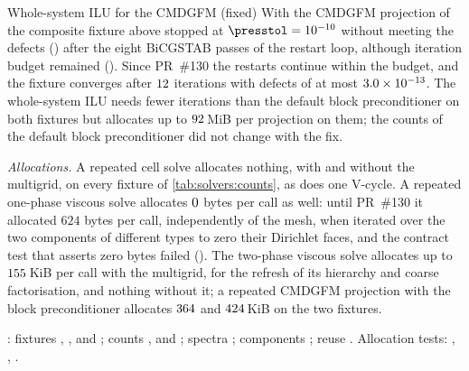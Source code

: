 \begin{deviation}{Whole-system ILU for the CMDGFM (fixed)}\label{dev:solvers:ilu}
With  the CMDGFM projection of the composite fixture
above stopped at $\presstol=10^{-10}$ without meeting the defects
() after the eight BiCGSTAB passes of the restart loop,
although iteration budget remained (). Since PR~\#130 the restarts
continue within the budget, and the fixture converges after
$12$ iterations with defects of at most
$3.0\times10^{-13}$. The whole-system ILU needs fewer iterations than
the default block preconditioner on both fixtures but allocates up to
$92$\,MiB per projection on them; the counts of the default
block preconditioner did not change with the fix.
\end{deviation}

\emph{Allocations.} A repeated cell solve allocates nothing, with and without
the multigrid, on every fixture of \cref{tab:solvers:counts}, as does one
V-cycle. A repeated one-phase viscous solve allocates
$0$ bytes per call as well: until PR~\#130 it allocated
$624$ bytes per call, independently of the mesh, when 
iterated over the two components of different types to zero their Dirichlet
faces, and the contract test that asserts zero bytes failed ().
The two-phase
viscous solve allocates up to $155$\,KiB per call with the
multigrid, for the refresh of its hierarchy and coarse factorisation, and
nothing without it; a repeated CMDGFM projection with the block
preconditioner allocates $364$ and
$424$\,KiB on the two fixtures.

\begin{implnote}
: fixtures ,
,  and ; counts
,  and
; spectra ; components
; reuse . Allocation tests:
,
,
.
\end{implnote}
